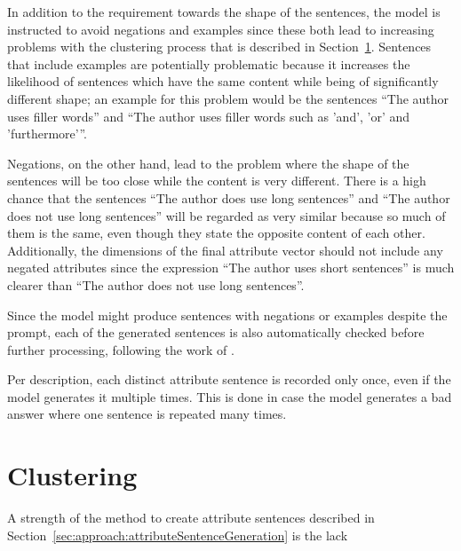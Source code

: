 In addition to the requirement towards the shape of the sentences, the model is instructed to avoid negations and examples since these both lead to increasing problems with the clustering process that is described in Section~\ref{sec:approach:clustering}.%
Sentences that include examples are potentially problematic because it increases the likelihood of sentences which have the same content while being of significantly different shape; an example for this problem would be the sentences \enquote{The author uses filler words} and \enquote{The author uses filler words such as 'and', 'or' and 'furthermore'}.%

Negations, on the other hand, lead to the problem where the shape of the sentences will be too close while the content is very different. There is a high chance that the sentences \enquote{The author does use long sentences} and \enquote{The author does not use long sentences} will be regarded as very similar because so much of them is the same, even though they state the opposite content of each other.
Additionally, the dimensions of the final attribute vector should not include any negated attributes since the expression \enquote{The author uses short sentences} is much clearer than \enquote{The author does not use long sentences}.

Since the model might produce sentences with negations or examples despite the prompt, each of the generated sentences is also automatically checked before further processing, following the work of \citet{patelLearningInterpretableStyle2023}.

Per description, each distinct attribute sentence is recorded only once, even if the model generates it multiple times. This is done in case the model generates a bad answer where one sentence is repeated many times.


\section{Clustering}%
\label{sec:approach:clustering}
A strength of the method to create attribute sentences described in Section~\ref{sec:approach:attributeSentenceGeneration} is the lack %

